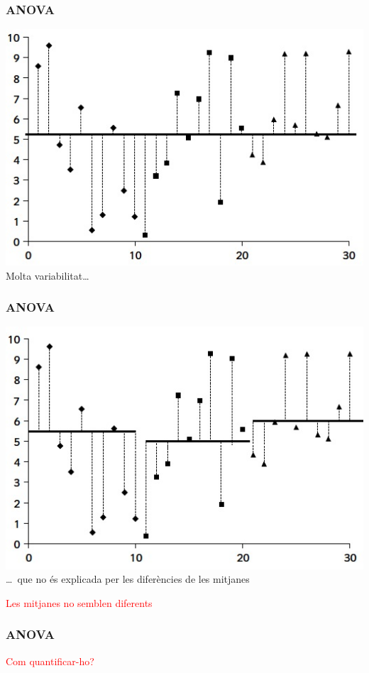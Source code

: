 \documentclass[12pt,t]{beamer}
\newcommand{\red}[1]{\textcolor{red}{#1}}
\theoremstyle{plain}
\theoremstyle{definition}
\begin{document}
\begin{frame}
\frametitle{ANOVA}

\begin{center}
\includegraphics[width=0.8\linewidth]{FD2-1}\\
Molta variabilitat\ldots 
\end{center}
\end{frame}

\begin{frame}
\frametitle{ANOVA}

\begin{center}
\includegraphics[width=0.8\linewidth]{FD2-2}\\
\ldots\ que no és explicada per les diferències de les mitjanes\\ \pause
\medskip

\red{Les mitjanes no semblen diferents}
\end{center}
\end{frame}

\begin{frame}
\frametitle{ANOVA}
\vspace*{1cm}

\begin{center}
\red{\Large Com quantificar-ho?}
\end{center}

\end{frame}
\end{document}
